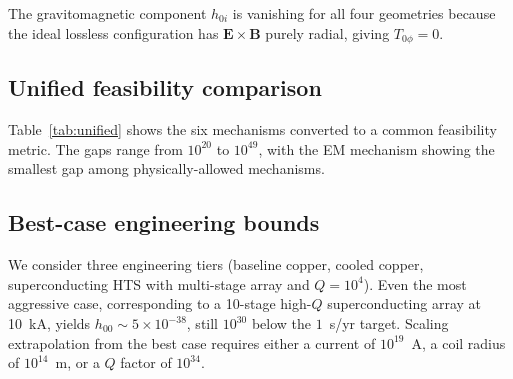 \documentclass[11pt,a4paper,twocolumn]{article}
\begin{document}
The gravitomagnetic component $h_{0i}$ is vanishing for all four
geometries because the ideal lossless configuration has
$\mathbf{E}\times\mathbf{B}$ purely radial, giving $T_{0\phi}=0$.

\subsection{Unified feasibility comparison}
\label{subsec:unified}

Table~\ref{tab:unified} shows the six mechanisms converted to a
common feasibility metric. The gaps range from $10^{20}$ to $10^{49}$,
with the EM mechanism showing the smallest gap among
physically-allowed mechanisms.

\begin{table}[t]
\centering
\caption{Unified feasibility across six mechanisms.
Gap $=$ required resource $/$ device-scale value.}
\label{tab:unified}
\end{table}



\subsection{Best-case engineering bounds}
\label{subsec:best_case}

We consider three engineering tiers (baseline copper, cooled copper,
superconducting HTS with multi-stage array and $Q=10^4$). Even the
most aggressive case, corresponding to a 10-stage high-$Q$
superconducting array at 10~kA, yields
$h_{00} \sim 5\times 10^{-38}$, still $10^{30}$ below the
$1$~s/yr target. Scaling extrapolation from the best case requires
either a current of $10^{19}$~A, a coil radius of
$10^{14}$~m, or a $Q$ factor of $10^{34}$.
\end{document}
